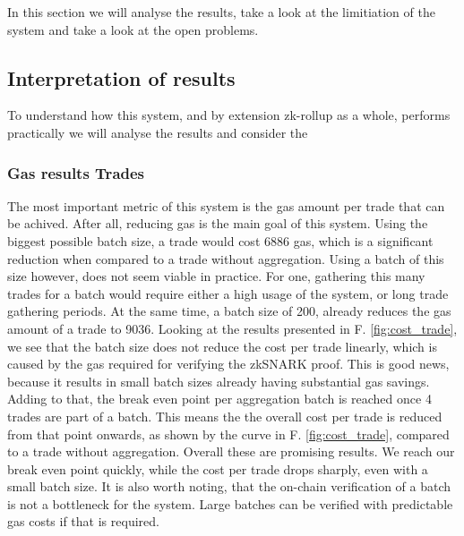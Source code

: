 \documentclass[../../thesis.tex]{subfiles}
\begin{document}
In this section we will analyse the results, take a look at the limitiation of the system and take a look at the open problems.

\subsection{Interpretation of results}
To understand how this system, and by extension zk-rollup as a whole, performs practically we will analyse the results and consider the 

\subsubsection{Gas results Trades}
The most important metric of this system is the gas amount per trade that can be achived. After all, reducing gas is the main goal of this system. Using the biggest possible batch size, a trade would cost 6886 gas, which is a significant reduction when compared to a trade without aggregation. Using a batch of this size however, does not seem viable in practice. For one, gathering this many trades for a batch would require either a high usage of the system, or long trade gathering periods. At the same time, a batch size of 200, already reduces the gas amount of a trade to 9036. Looking at the results presented in F. \ref{fig:cost_trade}, we see that the batch size does not reduce the cost per trade linearly, which is caused by the gas required for verifying the zkSNARK proof. This is good news, because it results in small batch sizes already having substantial gas savings. Adding to that, the break even point per aggregation batch is reached once 4 trades are part of a batch. This means the the overall cost per trade is reduced from that point onwards, as shown by the curve in F. \ref{fig:cost_trade}, compared to a trade without aggregation. Overall these are promising results. We reach our break even point quickly, while the cost per trade drops sharply, even with a small batch size. It is also worth noting, that the on-chain verification of a batch is not a bottleneck for the system. Large batches can be verified with predictable gas costs if that is required. 
\end{document}
